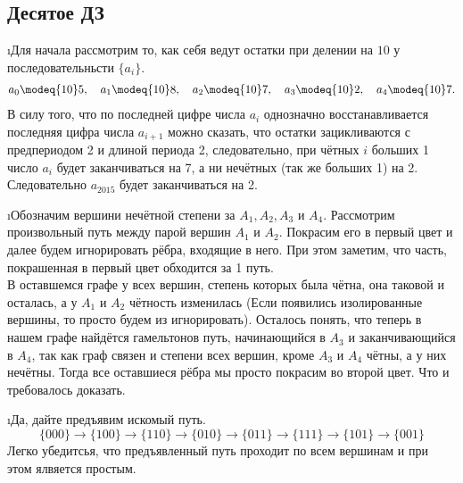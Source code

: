 \subsection{Десятое ДЗ}


\i Для начала рассмотрим то, как себя ведут остатки при делении на $10$ у последовательньсти $\{a_i\}$.
\begin{gather*}
    a_0 \modeq{10} 5, \quad a_1 \modeq{10} 8, \quad a_2 \modeq{10} 7, \quad a_3 \modeq{10} 2, \quad a_4 \modeq{10} 7.
\end{gather*}
В силу того, что по последней цифре числа $a_i$ однозначно восстанавливается последняя цифра числа $a_{i+1}$ можно сказать, что остатки зацикливаются с предпериодом 2 и длиной периода 2, следовательно, при чётных $i$ больших 1 число $a_i$ будет заканчиваться на 7, а ни нечётных (так же больших 1) на 2. Следовательно $a_{2015}$ будет заканчиваться на 2.

\i Обозначим вершини нечётной степени за $A_1, A_2, A_3$ и $A_4$. Рассмотрим произвольный путь между парой вершин $A_1$ и $A_2$. Покрасим его в первый цвет и далее будем игнорировать рёбра,  входящие в него. При этом заметим, что часть, покрашенная в первый цвет обходится за 1 путь.\\
В оставшемся графе у всех вершин, степень которых была чётна, она таковой и осталась, а у $A_1$ и $A_2$ чётность изменилась (Если появились изолированные вершины, то просто будем из игнорировать). Осталось понять, что теперь в нашем графе найдётся гамельтонов путь, начинающийся в $A_3$ и заканчивающийся в $A_4$, так как граф связен и степени всех вершин, кроме $A_3$ и $A_4$ чётны, а у них нечётны. Тогда все оставшиеся рёбра мы просто покрасим во второй цвет. Что и требовалось доказать.

\i Да, дайте предъявим искомый путь.
$$\{000\} \rightarrow \{100\} \rightarrow \{110\} \rightarrow \{010\} \rightarrow \{011\} \rightarrow \{111\} \rightarrow \{101\} \rightarrow \{001\}$$
Легко убедитсья, что предъявленный путь проходит по всем вершинам и при этом ялвяется простым.

